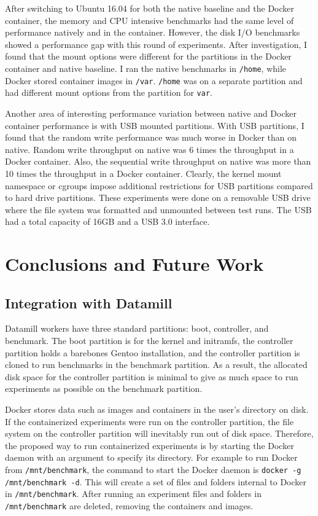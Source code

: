 \documentclass[11pt]{article}
\begin{document}
\begin{itemize}
After switching to Ubuntu 16.04 for both the native baseline and the Docker container, the memory and  CPU intensive benchmarks had the same level of performance natively and in the container. However, the disk I/O benchmarks showed a performance gap with this round of experiments. After investigation, I found that the mount options were different for the partitions in the Docker container and native baseline. I ran the native benchmarks in \texttt{/home}, while Docker stored container images in \texttt{/var}. \texttt{/home} was on a separate partition and had different mount options from the partition for \texttt{var}. 

Another area of interesting performance variation between native and Docker container performance is with USB mounted partitions. With USB partitions, I found that the random write performance was much worse in Docker than on native. Random write throughput on native was 6 times the throughput in a Docker container. Also, the sequential write throughput on native was more than 10 times the throughput in a Docker container. Clearly, the kernel mount namespace or cgroups impose additional restrictions for USB partitions compared to hard drive partitions. These experiments were done on a removable USB drive where the file system was formatted and unmounted between test runs. The USB had a total capacity of 16GB and a USB 3.0 interface. 

\section{Conclusions and Future Work}

\subsection{Integration with Datamill}
Datamill workers have three standard partitions: boot, controller, and benchmark. The boot partition is for the kernel and initramfs, the controller partition holds a barebones Gentoo installation, and the controller partition is cloned to run benchmarks in the benchmark partition. As a result, the allocated disk space for the controller partition is minimal to give as much space to run experiments as possible on the benchmark partition. 

Docker stores data such as images and containers in the user’s directory on disk. If the containerized experiments were run on the controller partition, the file system on the controller partition will inevitably run out of disk space. Therefore, the proposed way to run containerized experiments is by starting the Docker daemon with an argument to specify its directory. For example to run Docker from \texttt{/mnt/benchmark}, the command to start the Docker daemon is \texttt{docker -g /mnt/benchmark -d}. This will create a set of files and folders internal to Docker in \texttt{/mnt/benchmark}. After running an experiment files and folders in \texttt{/mnt/benchmark} are deleted, removing the containers and images. 


\end{itemize}
\end{document}
